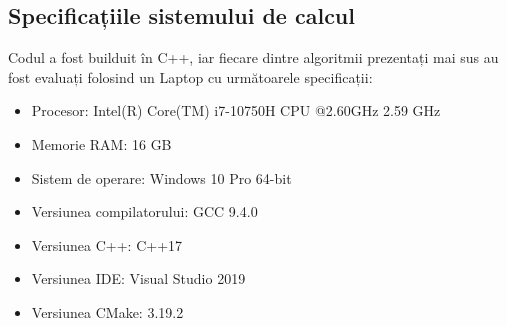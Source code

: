 \documentclass[runningheads]{llncs}
\begin{document}
\subsection{Specificațiile sistemului de calcul}
Codul a fost builduit în C++, iar fiecare dintre algoritmii prezentați mai sus au fost
evaluați folosind un Laptop cu următoarele specificații:
\begin{itemize}
\item Procesor: Intel(R) Core(TM) i7-10750H CPU @2.60GHz   2.59 GHz
\item Memorie RAM: 16 GB
\item Sistem de operare: Windows 10 Pro 64-bit
\item Versiunea compilatorului: GCC 9.4.0
\item Versiunea C++: C++17
\item Versiunea IDE: Visual Studio 2019
\item Versiunea CMake: 3.19.2
\end{itemize}



\end{document}
